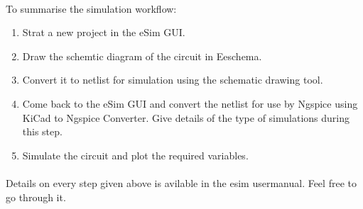 \paragraph{}To summarise the simulation workflow:

\begin{enumerate}
\item
Strat a new project in the eSim GUI.
\item
Draw the schemtic diagram of the circuit in Eeschema.
\item
Convert it to netlist for simulation using the schematic drawing tool.
\item
Come back to the eSim GUI and convert the netlist for use by Ngspice using KiCad to Ngspice Converter. Give details of the type of simulations during this step.

\item
Simulate the circuit and plot the required variables.

\end{enumerate}


\paragraph{}

Details on every step given above is avilable in the esim usermanual\cite{esimusermanual}. Feel free to go through it.



